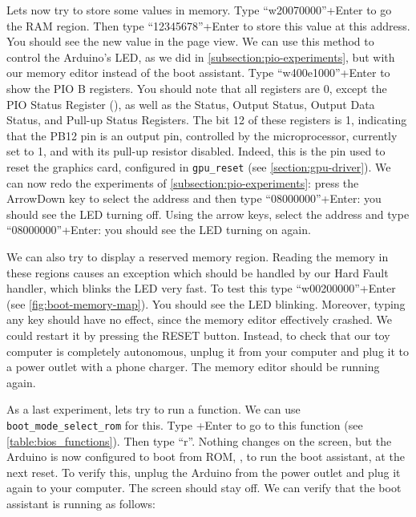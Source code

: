 Lets now try to store some values in memory. Type ``w20070000''+Enter to go the
RAM region. Then type ``12345678''+Enter to store this value at this address.
You should see the new value in the page view. We can use this method to
control the Arduino's LED, as we did in \cref{subsection:pio-experiments}, but
with our memory editor instead of the boot assistant. Type ``w400e1000''+Enter
to show the PIO B registers. You should note that all registers are 0, except
the PIO Status Register (), as well as the Status, Output
Status, Output Data Status, and Pull-up Status Registers. The bit 12 of these
registers is 1, indicating that the PB12 pin is an output pin, controlled by
the microprocessor, currently set to 1, and with its pull-up resistor disabled.
Indeed, this is the pin used to reset the graphics card, configured in
\verb!gpu_reset! (see \cref{section:gpu-driver}). We can now redo the
experiments of \cref{subsection:pio-experiments}: press the ArrowDown key to
select the  address and then type ``08000000''+Enter: you
should see the LED turning off. Using the arrow keys, select the
 address and type ``08000000''+Enter: you should see the LED
turning on again.

We can also try to display a reserved memory region. Reading the memory in
these regions causes an exception which should be handled by our Hard Fault
handler, which blinks the LED very fast. To test this type ``w00200000''+Enter
(see \cref{fig:boot-memory-map}). You should see the LED blinking. Moreover,
typing any key should have no effect, since the memory editor effectively
crashed. We could restart it by pressing the RESET button. Instead, to check
that our toy computer is completely autonomous, unplug it from your computer
and plug it to a power outlet with a phone charger. The memory editor should be
running again.


As a last experiment, lets try to run a function. We can use
\verb!boot_mode_select_rom! for this. Type
+Enter to go to this function (see
\cref{table:bios_functions}). Then type ``r''. Nothing changes on the screen,
but the Arduino is now configured to boot from ROM, \ie, to run the boot
assistant, at the next reset. To verify this, unplug the Arduino from the power
outlet and plug it again to your computer. The screen should stay off. We can
verify that the boot assistant is running as follows:

